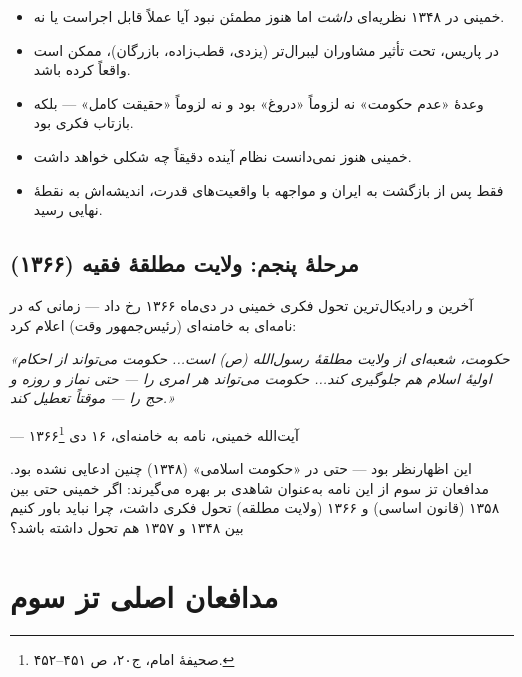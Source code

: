 \begin{principleBox}
\begin{itemize}[label=\textcolor{cGold}{$\bullet$}, rightmargin=2em]
    \item خمینی در ۱۳۴۸ نظریه‌ای \textit{داشت} اما هنوز مطمئن نبود آیا عملاً قابل اجراست یا نه.
    \item در پاریس، تحت تأثیر مشاوران لیبرال‌تر (یزدی، قطب‌زاده، بازرگان)، ممکن است واقعاً  کرده باشد.
    \item وعدهٔ «عدم حکومت» نه لزوماً «دروغ» بود و نه لزوماً «حقیقت کامل» — بلکه بازتاب  فکری بود.
    \item خمینی هنوز نمی‌دانست نظام آینده دقیقاً چه شکلی خواهد داشت.
    \item فقط پس از بازگشت به ایران و مواجهه با واقعیت‌های قدرت، اندیشه‌اش به نقطهٔ نهایی رسید.
\end{itemize}
\end{principleBox}

\subsection{مرحلهٔ پنجم: ولایت مطلقهٔ فقیه (۱۳۶۶)}

آخرین و رادیکال‌ترین تحول فکری خمینی در دی‌ماه ۱۳۶۶ رخ داد — زمانی که در نامه‌ای به خامنه‌ای (رئیس‌جمهور وقت) اعلام کرد:

\begin{warningBox}
\textit{«حکومت، شعبه‌ای از ولایت مطلقهٔ رسول‌الله (ص) است... حکومت می‌تواند از احکام اولیهٔ اسلام هم جلوگیری کند... حکومت می‌تواند هر امری را — حتی نماز و روزه و حج را — موقتاً تعطیل کند.»}

\hfill — آیت‌الله خمینی، نامه به خامنه‌ای، ۱۶ دی ۱۳۶۶\footnote{صحیفهٔ امام، ج۲۰، ص ۴۵۱–۴۵۲.}
\end{warningBox}

این اظهارنظر  بود — حتی در «حکومت اسلامی» (۱۳۴۸) چنین ادعایی نشده بود. مدافعان تز سوم از این نامه به‌عنوان شاهدی بر  بهره می‌گیرند: اگر خمینی حتی بین ۱۳۵۸ (قانون اساسی) و ۱۳۶۶ (ولایت مطلقه) تحول فکری داشت، چرا نباید باور کنیم بین ۱۳۴۸ و ۱۳۵۷ هم تحول داشته باشد؟

\section{مدافعان اصلی تز سوم}

